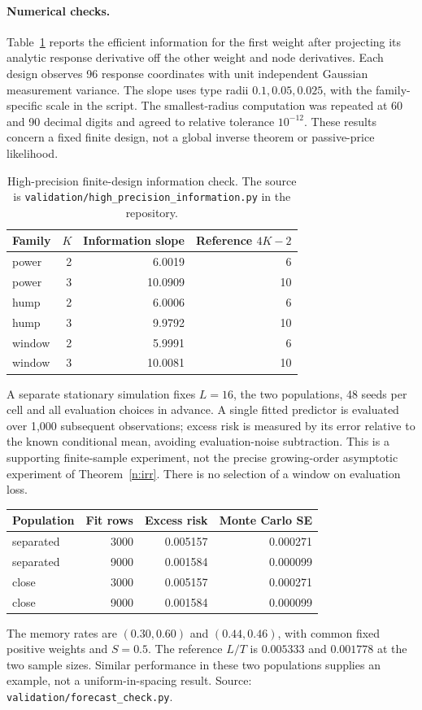 \documentclass[12pt]{article}
\theoremstyle{definition}
\theoremstyle{remark}
\begin{document}
\paragraph{Numerical checks.} Table~\ref{tab:revisionnumerics} reports the efficient information for the first weight after projecting its analytic response derivative off the other weight and node derivatives. Each design observes 96 response coordinates with unit independent Gaussian measurement variance. The slope uses type radii $0.1,0.05,0.025$, with the family-specific scale in the script. The smallest-radius computation was repeated at 60 and 90 decimal digits and agreed to relative tolerance $10^{-12}$. These results concern a fixed finite design, not a global inverse theorem or passive-price likelihood.
\begin{table}[ht]\centering
\begin{tabular}{lrrr}\toprule Family & $K$ & Information slope & Reference $4K-2$\\\midrule
power & 2 & 6.0019 & 6\\
power & 3 & 10.0909 & 10\\
hump & 2 & 6.0006 & 6\\
hump & 3 & 9.9792 & 10\\
window & 2 & 5.9991 & 6\\
window & 3 & 10.0081 & 10\\
\bottomrule\end{tabular}
\caption{High-precision finite-design information check. The source is \nolinkurl{validation/high_precision_information.py} in the repository.}\label{tab:revisionnumerics}\end{table}

A separate stationary simulation fixes $L=16$, the two populations, 48 seeds per cell and all evaluation choices in advance. A single fitted predictor is evaluated over 1,000 subsequent observations; excess risk is measured by its error relative to the known conditional mean, avoiding evaluation-noise subtraction. This is a supporting finite-sample experiment, not the precise growing-order asymptotic experiment of Theorem~\ref{n:irr}. There is no selection of a window on evaluation loss.
\begin{center}\begin{tabular}{lrrr}\toprule Population & Fit rows & Excess risk & Monte Carlo SE\\\midrule
separated & 3000 & 0.005157 & 0.000271\\
separated & 9000 & 0.001584 & 0.000099\\
close & 3000 & 0.005157 & 0.000271\\
close & 9000 & 0.001584 & 0.000099\\
\bottomrule\end{tabular}\end{center}
The memory rates are $(0.30,0.60)$ and $(0.44,0.46)$, with common fixed positive weights and $S=0.5$. The reference $L/T$ is $0.005333$ and $0.001778$ at the two sample sizes. Similar performance in these two populations supplies an example, not a uniform-in-spacing result. Source: \nolinkurl{validation/forecast_check.py}.
\end{document}

